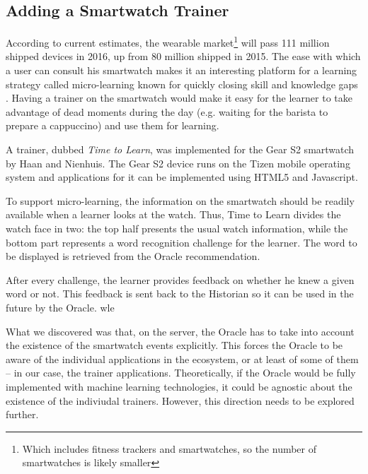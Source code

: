 

\subsection {Adding a Smartwatch Trainer}

According to current estimates, the wearable market\footnote{Which includes fitness trackers and smartwatches, so the number of smartwatches is likely smaller} will pass 111 million shipped devices in 2016, up from 80 million shipped in 2015. The ease with which a user can consult his smartwatch makes it an interesting platform for a learning strategy called micro-learning known for quickly closing skill and knowledge gaps  \cite{Dear12}. Having a trainer on the smartwatch would make it easy for the learner to take advantage of dead moments during the day (e.g. waiting for the barista to prepare a cappuccino) and use them for learning.

A trainer, dubbed {\em Time to Learn}, was implemented for the Gear S2 smartwatch by Haan and Nienhuis\cite{Nien16time}. The Gear S2 device runs on the Tizen mobile operating system and applications for it can be implemented using HTML5 and Javascript.

To support micro-learning, the information on the smartwatch should be readily available when a learner looks at the watch. Thus, Time to Learn divides the watch face in two: the top half presents the usual watch information, while the bottom part represents a word recognition challenge for the learner. The word to be displayed is retrieved from the Oracle recommendation. 

After every challenge, the learner provides feedback on whether he knew a given word or not. This feedback is sent back to the Historian so it can be used in the future by the Oracle.
wle

What we discovered was that, on the server, the Oracle has to take into account the existence of the smartwatch events explicitly. This forces the Oracle to be aware of the individual applications in the ecosystem, or at least of some of them -- in our case, the trainer applications. Theoretically, if the Oracle would be fully implemented with machine learning technologies, it could be agnostic about the existence of the indiviudal trainers. However, this direction needs to be explored further.



